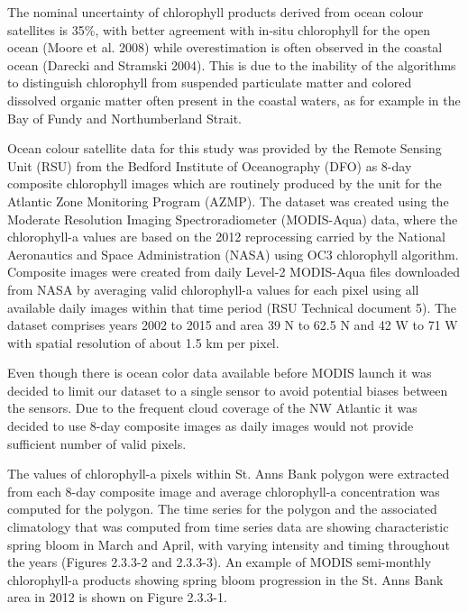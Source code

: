 \documentclass[letterpaper,portrait,12pt]{scrartcl}
\numberwithin{equation}{section}		%
\numberwithin{figure}{section}			%
\numberwithin{table}{section}				%
\begin{document}
 




The nominal uncertainty of chlorophyll products derived from ocean colour satellites is 35\%, with better agreement with in-situ chlorophyll for the open ocean (Moore et al. 2008) while overestimation is often observed in the coastal ocean (Darecki and Stramski 2004). This is due to the inability of the algorithms to distinguish chlorophyll from suspended particulate matter and colored dissolved organic matter often present in the coastal waters, as for example in the Bay of Fundy and Northumberland Strait.




 




Ocean colour satellite data for this study was provided by the Remote Sensing Unit (RSU) from the Bedford Institute of Oceanography (DFO) as 8-day composite chlorophyll images which are routinely produced by the unit for the Atlantic Zone Monitoring Program (AZMP). The dataset was created using the Moderate Resolution Imaging Spectroradiometer (MODIS-Aqua) data, where the chlorophyll-a values are based on the 2012 reprocessing carried by the National Aeronautics and Space Administration (NASA) using OC3 chlorophyll algorithm. Composite images were created from daily Level-2 MODIS-Aqua files downloaded from NASA by averaging valid chlorophyll-a values for each pixel using all available daily images within that time period (RSU Technical document 5). The dataset comprises years 2002 to 2015 and area \colorbox[rgb]{0.000,1.000,1.000}{39 N to 62.5 N and 42 W to 71 W with spatial resolution of about 1.5 km per pixel. } 




 




Even though there is ocean color data available before MODIS launch it was decided to limit our dataset to a single sensor to avoid potential biases between the sensors. Due to the frequent cloud coverage of the NW Atlantic it was decided to use 8-day composite images as daily images would not provide sufficient number of valid pixels. 









 The values of chlorophyll-a pixels within St. Anns Bank polygon were extracted from each 8-day composite image and average chlorophyll-a concentration was computed for the polygon. The time series for the polygon and the associated climatology that was computed from time series data are showing characteristic spring bloom in March and April, with varying intensity and timing throughout the years (Figures 2.3.3-2 and 2.3.3-3). An example of MODIS semi-monthly chlorophyll-a products showing spring bloom progression in the St. Anns Bank area in 2012 is shown on Figure 2.3.3-1.
\end{document}
